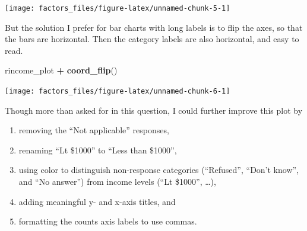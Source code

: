\documentclass[]{book}
\newenvironment{Shaded}{\begin{snugshade}}{\end{snugshade}}
\newcommand{\KeywordTok}[1]{\textcolor[rgb]{0.13,0.29,0.53}{\textbf{#1}}}
\newcommand{\NormalTok}[1]{#1}
\newcommand{\OperatorTok}[1]{\textcolor[rgb]{0.81,0.36,0.00}{\textbf{#1}}}
\newcommand{\StringTok}[1]{\textcolor[rgb]{0.31,0.60,0.02}{#1}}
\providecommand{\tightlist}{%
  \setlength{\itemsep}{0pt}\setlength{\parskip}{0pt}}
\theoremstyle{plain}
\theoremstyle{remark}
\begin{document}
\begin{center}\texttt{[image: factors\_files/figure-latex/unnamed-chunk-5-1]} \end{center}

But the solution I prefer for bar charts with long labels is to flip the axes, so that the bars are horizontal.
Then the category labels are also horizontal, and easy to read.

\begin{Shaded}
\begin{Highlighting}[]
\NormalTok{rincome_plot }\OperatorTok{+}
\StringTok{  }\KeywordTok{coord_flip}\NormalTok{()}
\end{Highlighting}
\end{Shaded}

\begin{center}\texttt{[image: factors\_files/figure-latex/unnamed-chunk-6-1]} \end{center}

Though more than asked for in this question, I could further improve this plot by

\begin{enumerate}
\def\labelenumi{\arabic{enumi}.}
\tightlist
\item
  removing the ``Not applicable'' responses,
\item
  renaming ``Lt \$1000'' to ``Less than \$1000'',
\item
  using color to distinguish non-response categories (``Refused'', ``Don't know'', and ``No answer'') from income levels (``Lt \$1000'', \ldots{}),
\item
  adding meaningful y- and x-axis titles, and
\item
  formatting the counts axis labels to use commas.
\end{enumerate}
\end{document}
